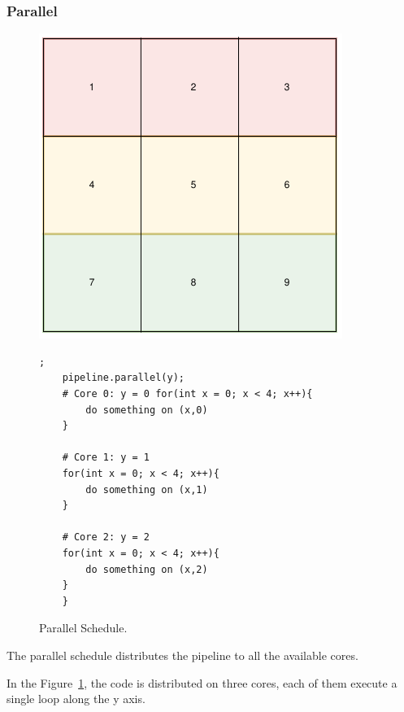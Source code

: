\subsubsection{Parallel}
\begin{figure}[H]

		\begin{minipage}[c]{\EIW}
			\centering
		\includegraphics[width=\textwidth]{Images/Parallel.png}
		\end{minipage}
		\begin{minipage}[c]{\ECW}
			\centering
			\begin{lstlisting}[label={code:reorder}];
	pipeline.parallel(y);
	# Core 0: y = 0 for(int x = 0; x < 4; x++){
		do something on (x,0)
	}

	# Core 1: y = 1
	for(int x = 0; x < 4; x++){
		do something on (x,1)
	}

	# Core 2: y = 2
	for(int x = 0; x < 4; x++){
		do something on (x,2)
	}
	}
\end{lstlisting}
		\end{minipage}
		\caption{Parallel Schedule.}
		\label{schedule:parallel}
\end{figure}


The parallel schedule distributes the pipeline to all the available cores.

In the Figure~\ref{schedule:parallel}, the code is distributed on three cores, each of them execute a single loop along the y axis.

